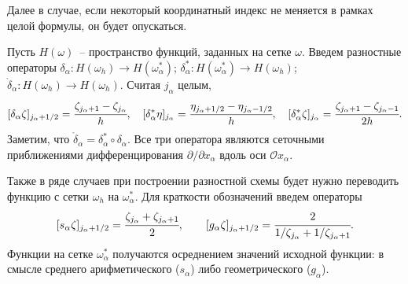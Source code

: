 Далее в случае, если некоторый координатный индекс не меняется в рамках целой формулы, он будет опускаться.

Пусть $H(\omega)$~-- пространство функций, заданных на сетке $\omega$. Введем разностные операторы $\delta_\alpha: H(\omega_h) \to H(\omega^*_\alpha)$; $\delta^*_\alpha: H(\omega^*_\alpha) \to H(\omega_h)$; $\mathring{\delta}_\alpha: H(\omega_h) \to H(\omega_h)$. Считая $j_\alpha$ целым,
\[
    [\delta_\alpha \zeta]_{j_\alpha + 1/2} = \cfrac{\zeta_{j_\alpha + 1} - \zeta_{j_\alpha}}{h}, \quad [\delta^*_\alpha \eta]_{j_\alpha} = \cfrac{\eta_{j_\alpha + 1/2} - \eta_{j_\alpha - 1/2}}{h}, \quad [\delta^*_\alpha \zeta]_{j_\alpha} = \cfrac{\zeta_{j_\alpha + 1} - \zeta_{j_\alpha - 1}}{2h}.
\]
Заметим, что $\mathring{\delta}_\alpha = \delta^*_\alpha \circ \delta_\alpha$. Все три оператора являются сеточными приближениями дифференцирования $\partial / \partial x_\alpha$ вдоль оси $\mathcal{O}x_\alpha$.

Также в ряде случаев при построении разностной схемы будет нужно переводить функцию с сетки $\omega_h$ на $\omega^*_\alpha$. Для краткости обозначений введем операторы
\[
    [s_\alpha \zeta]_{j_\alpha + 1/2} = \cfrac{\zeta_{j_\alpha} + \zeta_{j_\alpha + 1}}{2}, \qquad [g_\alpha \zeta]_{j_\alpha + 1/2} = \cfrac{2}{1 / \zeta_{j_\alpha} + 1 / \zeta_{j_\alpha + 1}}.
\]
Функции на сетке $\omega^*_\alpha$ получаются осреднением значений исходной функции: в смысле среднего арифметического ($s_\alpha$) либо геометрического ($g_\alpha$).

